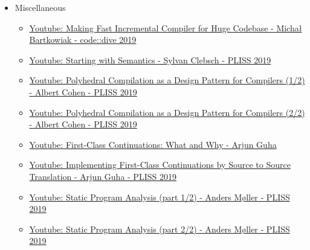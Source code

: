 \documentclass[12pt, a4paper]{report}
\begin{document}
\begin{itemize}[noitemsep]
\begin{itemize}[noitemsep]
    \item \href{https://blog.mozilla.org/nnethercote/2020/08/05/how-to-speed-up-the-rust-compiler-some-more-in-2020/}{\Square Nethercote: How to speed up the Rust compiler some more in 2020}
    \item \href{https://blog.mozilla.org/nnethercote/2020/09/08/how-to-speed-up-the-rust-compiler-one-last-time/}{\Square Nethercote: How to speed up the Rust compiler one last time}
    \item \href{https://pingcap.com/blog/rust-compilation-model-calamity}{\Square PingCAP Blog: The Rust Compilation Model Calamity}
    \item \href{https://pingcap.com/blog/generics-and-compile-time-in-rust}{\Square PingCAP Blog: Generics and Compile-Time in Rust}
    \item \href{https://pingcap.com/blog/rust-huge-compilation-units}{\Square PingCAP Blog: Rust's Huge Compilation Units}
    \item \href{https://pingcap.com/blog/reasons-rust-compiles-slowly}{\Square PingCAP Blog: A Few More Reasons Rust Compiles Slowly}
    \end{itemize}

  \item Miscellaneous
    \begin{itemize}[noitemsep]

    \item \href{https://www.youtube.com/watch?v=S2dK5lLFD_0}{\Square Youtube: Making Fast Incremental Compiler for Huge Codebase - Michał Bartkowiak - code::dive 2019}
    \item \href{https://www.youtube.com/watch?v=JbS8a-Ba0Ck}{\Square Youtube: Starting with Semantics - Sylvan Clebsch - PLISS 2019}
    \item \href{https://www.youtube.com/watch?v=mt6pIpt5Wk0}{\Square Youtube: Polyhedral Compilation as a Design Pattern for Compilers (1/2) - Albert Cohen - PLISS 2019}
    \item \href{https://www.youtube.com/watch?v=3TNT5rFVTUY}{\Square Youtube: Polyhedral Compilation as a Design Pattern for Compilers (2/2) - Albert Cohen - PLISS 2019}
    \item \href{https://www.youtube.com/watch?v=yvlhwZgUPG0}{\Square Youtube: First-Class Continuations: What and Why - Arjun Guha}
    \item \href{https://www.youtube.com/watch?v=n_GhkL8GDAk}{\Square Youtube: Implementing First-Class Continuations by Source to Source Translation - Arjun Guha - PLISS 2019}
    \item \href{https://www.youtube.com/watch?v=Lr4cMmaJHrg}{\Square Youtube: Static Program Analysis (part 1/2) - Anders Møller - PLISS 2019}
    \item \href{https://www.youtube.com/watch?v=6QQSIIvH-F0}{\Square Youtube: Static Program Analysis (part 2/2) - Anders Møller - PLISS 2019}

    \end{itemize}

  \end{itemize}


\printbibliography[
  heading=bibintoc,
  title={Bibliografia}
]
\end{document}
